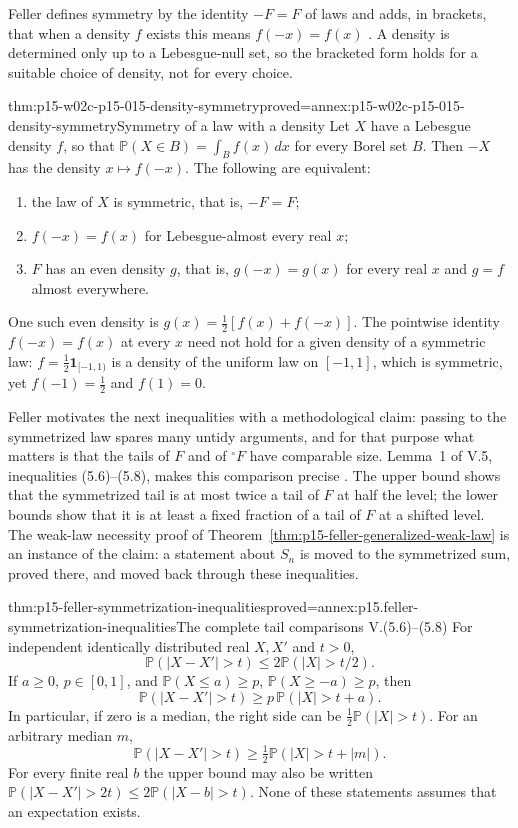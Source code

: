 Feller defines symmetry by the identity \(-F=F\) of laws and adds, in
brackets, that when a density \(f\) exists this means \(f(-x)=f(x)\)
\cite[V.5, p.~148]{Feller1971ProbabilityII}. A density is determined
only up to a Lebesgue-null set, so the bracketed form holds for a
suitable choice of density, not for every choice.

\begin{hbtheorem}{thm:p15-w02c-p15-015-density-symmetry}{proved=annex:p15-w02c-p15-015-density-symmetry}{Symmetry of a law with a density}
Let \(X\) have a Lebesgue density \(f\), so that
\(\mathbb P(X\in B)=\int_Bf(x)\,dx\) for every Borel set \(B\).
Then \(-X\) has the density \(x\mapsto f(-x)\). The following are
equivalent:
\begin{enumerate}
\item the law of \(X\) is symmetric, that is, \(-F=F\);
\item \(f(-x)=f(x)\) for Lebesgue-almost every real \(x\);
\item \(F\) has an even density \(g\), that is, \(g(-x)=g(x)\) for every
real \(x\) and \(g=f\) almost everywhere.
\end{enumerate}
One such even density is \(g(x)=\tfrac12[f(x)+f(-x)]\). The pointwise
identity \(f(-x)=f(x)\) at every \(x\) need not hold for a given density
of a symmetric law: \(f=\tfrac12\mathbf1_{[-1,1)}\) is a density of the
uniform law on \([-1,1]\), which is symmetric, yet \(f(-1)=\tfrac12\) and
\(f(1)=0\).
\end{hbtheorem}

Feller motivates the next inequalities with a methodological claim:
passing to the symmetrized law spares many untidy arguments, and for
that purpose what matters is that the tails of \(F\) and of
\({}^{\circ}F\) have comparable size. Lemma~1 of V.5, inequalities
(5.6)--(5.8), makes this comparison precise
\cite[V.5, p.~149]{Feller1971ProbabilityII}. The upper bound shows that
the symmetrized tail is at most twice a tail of \(F\) at half the
level; the lower bounds show that it is at least a fixed fraction of a
tail of \(F\) at a shifted level. The weak-law necessity proof of
Theorem~\ref{thm:p15-feller-generalized-weak-law} is an instance of
the claim: a statement about \(S_n\) is moved to the symmetrized sum,
proved there, and moved back through these inequalities.

\begin{hbtheorem}{thm:p15-feller-symmetrization-inequalities}{proved=annex:p15.feller-symmetrization-inequalities}{The complete tail comparisons V.(5.6)--(5.8)}
For independent identically distributed real \(X,X'\) and \(t>0\),
\[
 \mathbb P(|X-X'|>t)\leq2\mathbb P(|X|>t/2).
\]
If \(a\geq0\), \(p\in[0,1]\), and
\(\mathbb P(X\leq a)\geq p\),
\(\mathbb P(X\geq-a)\geq p\), then
\[
 \mathbb P(|X-X'|>t)\geq p\,\mathbb P(|X|>t+a).
\]
In particular, if zero is a median, the right side can be
\(\tfrac12\mathbb P(|X|>t)\).
For an arbitrary median \(m\),
\[
 \mathbb P(|X-X'|>t)
           \geq\tfrac12\mathbb P(|X|>t+|m|).
\]
For every finite real \(b\) the upper bound may also be written
\(\mathbb P(|X-X'|>2t)\leq2\mathbb P(|X-b|>t)\).
None of these statements assumes that an expectation exists.
\end{hbtheorem}

